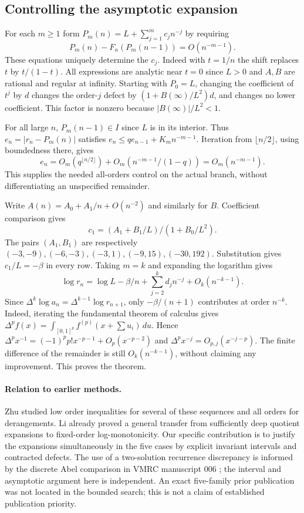 \documentclass[11pt,a4paper]{article}
\numberwithin{equation}{section}
\theoremstyle{definition}
\theoremstyle{remark}
\begin{document}
\subsection{Controlling the asymptotic expansion}
For each $m\ge1$ form $P_m(n)=L+\sum_{j=1}^m c_j n^{-j}$ by requiring
\[
 P_m(n)-F_n(P_m(n-1))=O(n^{-m-1}).
\]
These equations uniquely determine the $c_j$. Indeed with $t=1/n$ the shift replaces $t$ by $t/(1-t)$. All expressions are analytic near $t=0$ since $L>0$ and $A,B$ are rational and regular at infinity. Starting with $P_0=L$, changing the coefficient of $t^j$ by $d$ changes the order-$j$ defect by $(1+B(\infty)/L^2)d$, and changes no lower coefficient. This factor is nonzero because $|B(\infty)|/L^2<1$.

For all large $n$, $P_m(n-1)\in I$ since $L$ is in its interior. Thus $e_n=|r_n-P_m(n)|$ satisfies $e_n\le q e_{n-1}+K_m n^{-m-1}$. Iteration from $\lfloor n/2\rfloor$, using boundedness there, gives
\[
 e_n=O_m(q^{\lfloor n/2\rfloor})+O_m(n^{-m-1}/(1-q))=O_m(n^{-m-1}).
\]
This supplies the needed all-orders control on the actual branch, without differentiating an unspecified remainder.

Write $A(n)=A_0+A_1/n+O(n^{-2})$ and similarly for $B$. Coefficient comparison gives
\[
 c_1=(A_1+B_1/L)/(1+B_0/L^2).
\]
The pairs $(A_1,B_1)$ are respectively $(-3,-9),(-6,-3),(-3,1),(-9,15),(-30,192)$. Substitution gives $c_1/L=-\beta$ in every row. Taking $m=k$ and expanding the logarithm gives
\[
 \log r_n=\log L-\beta/n+\sum_{j=2}^k d_j n^{-j}+O_k(n^{-k-1}).
\]
Since $\Delta^k\log a_n=\Delta^{k-1}\log r_{n+1}$, only $-\beta/(n+1)$ contributes at order $n^{-k}$. Indeed, iterating the fundamental theorem of calculus gives $\Delta^p f(x)=\int_{[0,1]^p}f^{(p)}(x+\sum u_i)\,du$. Hence $\Delta^p x^{-1}=(-1)^pp! x^{-p-1}+O_p(x^{-p-2})$ and $\Delta^p x^{-j}=O_{p,j}(x^{-j-p})$. The finite difference of the remainder is still $O_k(n^{-k-1})$, without claiming any improvement. This proves the theorem.

\paragraph{Relation to earlier methods.}
Zhu \cite{r27reiwa:Zhu} studied low order inequalities for several of these sequences and all orders for derangements. Li \cite{r27reiwa:Li} already proved a general transfer from sufficiently deep quotient expansions to fixed-order log-monotonicity. Our specific contribution is to justify the expansions simultaneously in the five cases by explicit invariant intervals and contracted defects. The use of a two-solution recurrence discrepancy is informed by the discrete Abel comparison in VMRC manuscript 006 \cite{r27reiwa:VMRC}; the interval and asymptotic argument here is independent. An exact five-family prior publication was not located in the bounded search; this is not a claim of established publication priority.
\end{document}
